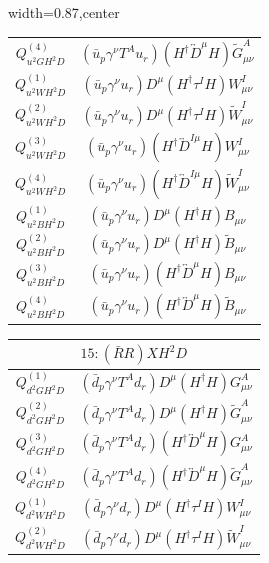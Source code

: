 \begin{table}[H]
\begin{center}
\begin{adjustbox}{width=0.87\textwidth,center}
\begin{minipage}[t]{5.6cm}
\begin{tabular}[t]{c|c}
%
$Q_{u^2GH^2D}^{(4)}$  &  $(\bar{u}_p \gamma^\nu T^A u_r) (H^\dag \overleftrightarrow{D}^\mu H) \widetilde G_{\mu\nu}^A$ \\
%
$Q_{u^2WH^2D}^{(1)}$  &  $(\bar{u}_p \gamma^\nu u_r) D^{\mu} (H^\dag \tau^I H) W_{\mu\nu}^I$ \\
%
$Q_{u^2WH^2D}^{(2)}$  &  $(\bar{u}_p \gamma^\nu u_r) D^{\mu} (H^\dag \tau^I H) \widetilde W_{\mu\nu}^I$ \\
%
$Q_{u^2WH^2D}^{(3)}$  &  $(\bar{u}_p \gamma^\nu u_r) (H^\dag \overleftrightarrow{D}^{I\mu} H) W_{\mu\nu}^I$ \\
%
$Q_{u^2WH^2D}^{(4)}$  &  $(\bar{u}_p \gamma^\nu u_r) (H^\dag \overleftrightarrow{D}^{I\mu} H) \widetilde W_{\mu\nu}^I$ \\
%
$Q_{u^2BH^2D}^{(1)}$  &  $(\bar{u}_p \gamma^\nu u_r) D^{\mu} (H^\dag H) B_{\mu\nu}$ \\
%
$Q_{u^2BH^2D}^{(2)}$  &  $(\bar{u}_p \gamma^\nu u_r) D^{\mu} (H^\dag H) \widetilde B_{\mu\nu}$ \\
%
$Q_{u^2BH^2D}^{(3)}$  &  $(\bar{u}_p \gamma^\nu u_r) (H^\dag \overleftrightarrow{D}^\mu H) B_{\mu\nu}$ \\
%
$Q_{u^2BH^2D}^{(4)}$  &  $(\bar{u}_p \gamma^\nu u_r) (H^\dag \overleftrightarrow{D}^\mu H) \widetilde B_{\mu\nu}$
\end{tabular}
\end{minipage}
\hspace{1cm}
\begin{minipage}[t]{6.4cm}
\renewcommand{\arraystretch}{1.5}
\begin{tabular}[t]{c|c}
\multicolumn{2}{c}{\boldmath$15:(\bar R R)XH^2D$} \\
\hline
$Q_{d^2GH^2D}^{(1)}$  &  $(\bar{d}_p \gamma^\nu T^A d_r) D^{\mu} (H^\dag H) G_{\mu\nu}^A$ \\
%
$Q_{d^2GH^2D}^{(2)}$  &  $(\bar{d}_p \gamma^\nu T^A d_r) D^{\mu} (H^\dag H) \widetilde G_{\mu\nu}^A$ \\
%
$Q_{d^2GH^2D}^{(3)}$  &  $(\bar{d}_p \gamma^\nu T^A d_r) (H^\dag \overleftrightarrow{D}^\mu H) G_{\mu\nu}^A$ \\
%
$Q_{d^2GH^2D}^{(4)}$  &  $(\bar{d}_p \gamma^\nu T^A d_r) (H^\dag \overleftrightarrow{D}^\mu H) \widetilde G_{\mu\nu}^A$ \\
%
$Q_{d^2WH^2D}^{(1)}$  &  $(\bar{d}_p \gamma^\nu d_r) D^{\mu} (H^\dag \tau^I H) W_{\mu\nu}^I$ \\
%
$Q_{d^2WH^2D}^{(2)}$  &  $(\bar{d}_p \gamma^\nu d_r) D^{\mu} (H^\dag \tau^I H) \widetilde W_{\mu\nu}^I$ \\

\end{tabular}
\end{minipage}
\end{adjustbox}
\end{center}
\end{table}
